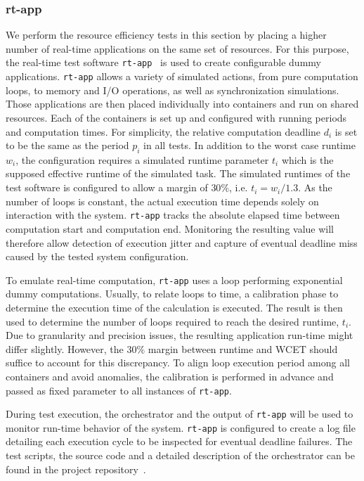 \documentclass[]{scrartcl}
\begin{document}
\subsubsection{rt-app}

We perform the resource efficiency tests in this section by placing a higher number of real-time applications on the same set of resources.
For this purpose, the real-time test software \texttt{rt-app}~\cite{rtapp01} is used to create configurable dummy applications. 
\texttt{rt-app} allows a variety of simulated actions, from pure computation loops, to memory and I/O operations, as well as synchronization simulations.
Those applications are then placed individually into containers and run on shared resources. 
Each of the containers is set up and configured with running periods and computation times.
For simplicity, the relative computation deadline $d_i$ is set to be the same as the period $p_i$ in all tests.
In addition to the worst case runtime $w_i$, the configuration requires a simulated runtime parameter $t_i$ which is the supposed effective runtime of the simulated task.
The simulated runtimes of the test software is configured to allow a margin of $30\%$, i.e. $t_i = w_i / 1.3$.
As the number of loops is constant, the actual execution time depends solely on interaction with the system.
\texttt{rt-app} tracks the absolute elapsed time between computation start and computation end.
Monitoring the resulting value will therefore allow detection of execution jitter and capture of eventual deadline miss caused by the tested system configuration.

To emulate real-time computation, \texttt{rt-app} uses a loop performing exponential dummy computations. 
Usually, to relate loops to time, a calibration phase to determine the execution time of the calculation is executed.
The result is then used to determine the number of loops required to reach the desired runtime, $t_i$. 
Due to granularity and precision issues, the resulting application run-time might differ slightly.
However, the $30\%$ margin between runtime and WCET should suffice to account for this discrepancy.
To align loop execution period among all containers and avoid anomalies, the calibration is performed in advance and passed as fixed parameter to all instances of \texttt{rt-app}.


During test execution, the orchestrator and the output of \texttt{rt-app} will be used to monitor run-time behavior of the system.
\texttt{rt-app} is configured to create a log file detailing each execution cycle to be inspected for eventual deadline failures.
The test scripts, the source code and a detailed description of the orchestrator can be found in the project repository~\cite{homep01}.
\end{document}

